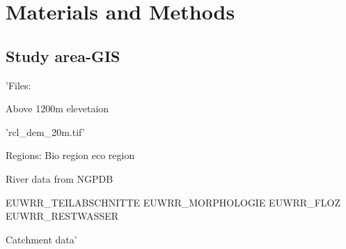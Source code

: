 

\section{Materials and Methods}\label{sec:material_methods}          %





\subsection{Study area-GIS}\label{sec:study_area-GIS}                %




'Files:

Above 1200m elevetaion

'rcl_dem_20m.tif'



Regions:
Bio region
eco region


River data from NGPDB

EUWRR_TEILABSCHNITTE
EUWRR_MORPHOLOGIE
EUWRR_FLOZ
EUWRR_RESTWASSER


Catchment data'


















